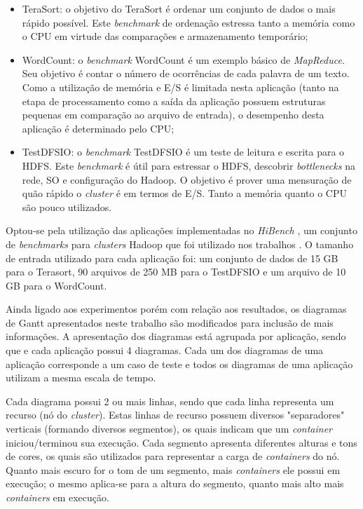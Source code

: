 \begin{itemize}
	\item TeraSort: o objetivo do TeraSort \citep{TeraSort2008} é ordenar um conjunto de dados o mais rápido possível. Este \textit{benchmark} de ordenação estressa tanto a memória como o CPU em virtude das comparações e armazenamento temporário;
	\item WordCount: o \textit{benchmark} WordCount é um exemplo básico de \textit{MapReduce}. Seu objetivo é contar o número de ocorrências de cada palavra de um texto. Como a utilização de memória e E/S é limitada nesta aplicação (tanto na etapa de processamento como a saída da aplicação possuem estruturas pequenas em comparação ao arquivo de entrada), o desempenho desta aplicação é determinado pelo CPU;
	\item TestDFSIO: o \textit{benchmark} TestDFSIO é um teste de leitura e escrita para o HDFS. Este \textit{benchmark} é útil para estressar o HDFS, descobrir \textit{bottlenecks} na rede, SO e configuração do Hadoop. O objetivo é prover uma mensuração de quão rápido o \textit{cluster} é em termos de E/S. Tanto a memória quanto o CPU são pouco utilizados.
\end{itemize}

Optou-se pela utilização das aplicações implementadas no \textit{HiBench} \cite{HiBench}, um conjunto de \textit{benchmarks} para \textit{clusters} Hadoop que foi utilizado nos trabalhos \cite{HBA} \cite{HBB} \cite{HBC}. O tamanho de entrada utilizado para cada aplicação foi: um conjunto de dados de 15 GB para o Terasort, 90 arquivos de 250 MB para o TestDFSIO e um arquivo de 10 GB para o WordCount. 

Ainda ligado aos experimentos porém com relação aos resultados, os diagramas de Gantt apresentados neste trabalho são modificados para inclusão de mais informações. A apresentação dos diagramas está agrupada por aplicação, sendo que e cada aplicação possui 4 diagramas. Cada um dos diagramas de uma aplicação corresponde a um caso de teste e todos os diagramas de uma aplicação utilizam a mesma escala de tempo.

Cada diagrama possui 2 ou mais linhas, sendo que cada linha representa  um recurso (nó do \textit{cluster}). Estas linhas de recurso possuem diversos "separadores" verticais (formando diversos segmentos), os quais indicam que um \textit{container} iniciou/terminou sua execução. Cada segmento apresenta diferentes alturas e tons de cores, os quais são utilizados para representar a carga de \textit{containers} do nó. Quanto mais escuro for o tom de um segmento, mais \textit{containers} ele possui em execução; o mesmo aplica-se para a altura do segmento, quanto mais alto mais \textit{containers} em execução.

